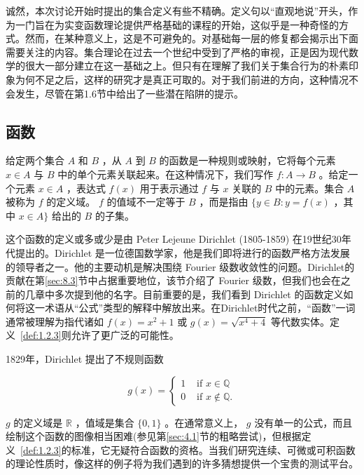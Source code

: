 诚然，本次讨论开始时提出的集合定义有些不精确。定义句以“直观地说”开头，作为一门旨在为实变函数理论提供严格基础的课程的开始，这似乎是一种奇怪的方式。然而，在某种意义上，这是不可避免的。对基础每一层的修复都会揭示出下面需要关注的内容。集合理论在过去一个世纪中受到了严格的审视，正是因为现代数学的很大一部分建立在这一基础之上。但只有在理解了我们关于集合行为的朴素印象为何不足之后，这样的研究才是真正可取的。对于我们前进的方向，这种情况不会发生，尽管在第1.6节中给出了一些潜在陷阱的提示。

\subsection{函数}
\begin{Def}
  \label{def:1.2.3}
  给定两个集合 \(A\) 和 \(B\) ，从 \(A\) 到 \(B\) 的函数是一种规则或映射，它将每个元素 \(x \in  A\) 与 \(B\) 中的单个元素关联起来。在这种情况下，我们写作 \(f : A \rightarrow  B\) 。给定一个元素 \(x \in  A\) ，表达式 \(f\left( x\right)\) 用于表示通过 \(f\) 与 \(x\) 关联的 \(B\) 中的元素。集合 \(A\) 被称为 \(f\) 的定义域。 \(f\) 的值域不一定等于 \(B\) ，而是指由 \(\{ y \in  B : y = f\left( x\right)\) ，其中 \(x \in  A\}\) 给出的 \(B\) 的子集。
\end{Def}


这个函数的定义或多或少是由 Peter Lejeune Dirichlet (1805-1859) 在19世纪30年代提出的。Dirichlet 是一位德国数学家，他是我们即将进行的函数严格方法发展的领导者之一。他的主要动机是解决围绕 Fourier 级数收敛性的问题。Dirichlet的贡献在第\ref{sec:8.3}节中占据重要地位，该节介绍了 Fourier 级数，但我们也会在之前的几章中多次提到他的名字。目前重要的是，我们看到 Dirichlet 的函数定义如何将这一术语从“公式”类型的解释中解放出来。在Dirichlet时代之前，“函数”一词通常被理解为指代诸如 \(f\left( x\right)  = {x}^{2} + 1\) 或 \(g\left( x\right)  = \sqrt{{x}^{4} + 4}\) 等代数实体。定义~\ref{def:1.2.3}则允许了更广泛的可能性。

\begin{Eg}
  \label{eg:1.2.4}
1829年，Dirichlet 提出了不规则函数

\[
g\left( x\right)  = \left\{  \begin{array}{ll} 1 & \text{ if }x \in  \mathbb{Q} \\  0 & \text{ if }x \notin  \mathbb{Q}. \end{array}\right.
\]

\(g\) 的定义域是 \(\mathbb{R}\) ，值域是集合 \(\{ 0,1\}\) 。在通常意义上， \(g\) 没有单一的公式，而且绘制这个函数的图像相当困难(参见第\ref{sec:4.1}节的粗略尝试)，但根据定义~\ref{def:1.2.3}的标准，它无疑符合函数的资格。当我们研究连续、可微或可积函数的理论性质时，像这样的例子将为我们遇到的许多猜想提供一个宝贵的测试平台。
\end{Eg}


